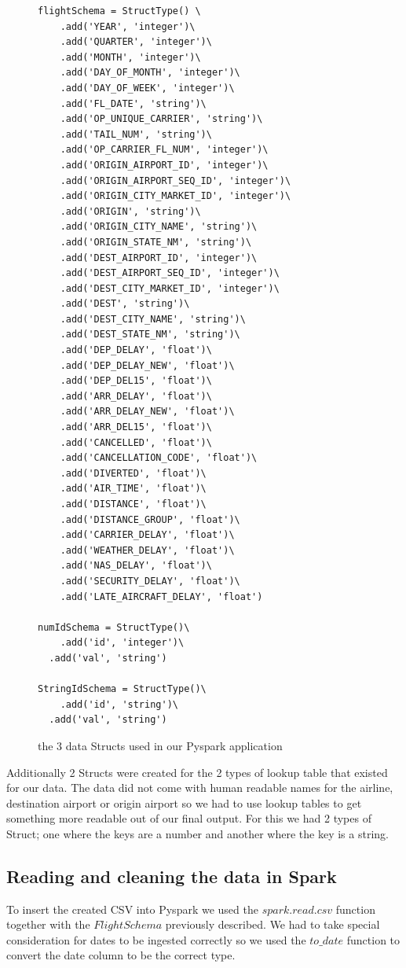 \begin{figure}[H]
\centering
\begin{lstlisting}
flightSchema = StructType() \
	.add('YEAR', 'integer')\
	.add('QUARTER', 'integer')\
	.add('MONTH', 'integer')\
	.add('DAY_OF_MONTH', 'integer')\
	.add('DAY_OF_WEEK', 'integer')\
	.add('FL_DATE', 'string')\
	.add('OP_UNIQUE_CARRIER', 'string')\
	.add('TAIL_NUM', 'string')\
	.add('OP_CARRIER_FL_NUM', 'integer')\
	.add('ORIGIN_AIRPORT_ID', 'integer')\
	.add('ORIGIN_AIRPORT_SEQ_ID', 'integer')\
	.add('ORIGIN_CITY_MARKET_ID', 'integer')\
	.add('ORIGIN', 'string')\
	.add('ORIGIN_CITY_NAME', 'string')\
	.add('ORIGIN_STATE_NM', 'string')\
	.add('DEST_AIRPORT_ID', 'integer')\
	.add('DEST_AIRPORT_SEQ_ID', 'integer')\
	.add('DEST_CITY_MARKET_ID', 'integer')\
	.add('DEST', 'string')\
	.add('DEST_CITY_NAME', 'string')\
	.add('DEST_STATE_NM', 'string')\
	.add('DEP_DELAY', 'float')\
	.add('DEP_DELAY_NEW', 'float')\
	.add('DEP_DEL15', 'float')\
	.add('ARR_DELAY', 'float')\
	.add('ARR_DELAY_NEW', 'float')\
	.add('ARR_DEL15', 'float')\
	.add('CANCELLED', 'float')\
	.add('CANCELLATION_CODE', 'float')\
	.add('DIVERTED', 'float')\
	.add('AIR_TIME', 'float')\
	.add('DISTANCE', 'float')\
	.add('DISTANCE_GROUP', 'float')\
	.add('CARRIER_DELAY', 'float')\
	.add('WEATHER_DELAY', 'float')\
	.add('NAS_DELAY', 'float')\
	.add('SECURITY_DELAY', 'float')\
	.add('LATE_AIRCRAFT_DELAY', 'float')

numIdSchema = StructType()\
	.add('id', 'integer')\
  .add('val', 'string')

StringIdSchema = StructType()\
	.add('id', 'string')\
  .add('val', 'string')
\end{lstlisting}
\caption{the 3 data Structs used in our Pyspark application}
\label{fig:structs}
\end{figure}

Additionally 2 Structs were created for the 2 types of lookup table that existed for our data. The data did not come with human readable names for the airline, destination airport or origin airport so we had to use lookup tables to get something more readable out of our final output. For this we had 2 types of Struct; one where the keys are a number and another where the key is a string.


\subsection{Reading and cleaning the data in Spark}
To insert the created CSV into Pyspark we used the $spark.read.csv$ function together with the $FlightSchema$ previously described. We had to take special consideration for dates to be ingested correctly so we used the $to\_date$ function to convert the date column to be the correct type. 

